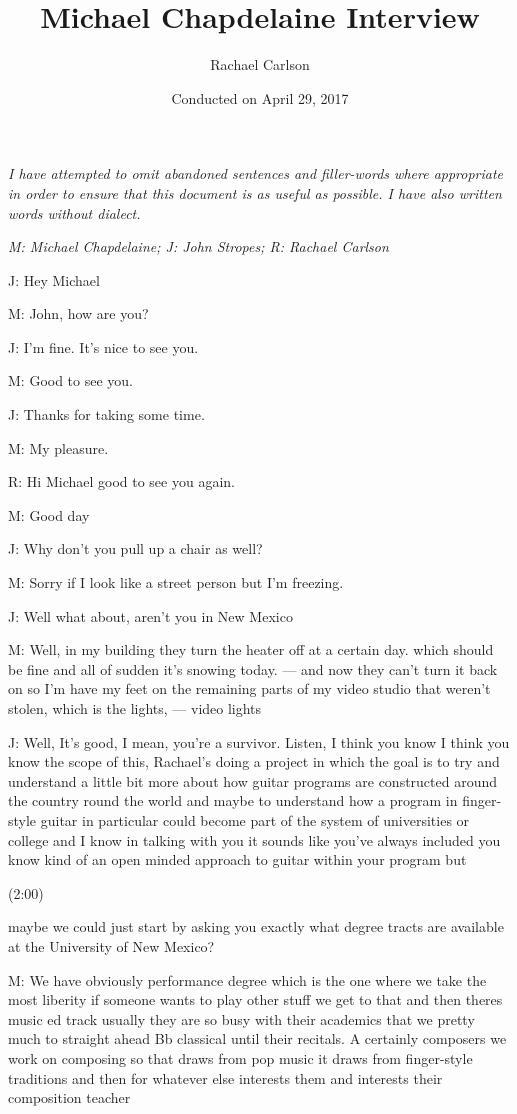 \documentclass[11pt]{article}
\author{Rachael Carlson}
\date{Conducted on April 29, 2017}
\title{Michael Chapdelaine Interview}
\begin{document}
\maketitle
\flushleft

\emph{I have attempted to omit abandoned sentences and filler-words where appropriate in order to ensure that this document is as useful as possible. I have also written words without dialect.}

\emph{M: Michael Chapdelaine; J: John Stropes; R: Rachael Carlson}

J: Hey Michael

M: John, how are you?

J: I'm fine. It's nice to see you.

M: Good to see you.

J: Thanks for taking some time.

M: My pleasure.

R: Hi Michael good to see you again.

M: Good day

J: Why don't you pull up a chair as well?

M: Sorry if I look like a street person but I'm freezing.

J: Well what about, aren't you in New Mexico

M: Well, in my building they turn the heater off at a certain day. which should be fine and all of sudden it's snowing today. --- and now they can't turn it back on so I'm have my feet on the remaining parts of my video studio that weren't stolen, which is the lights, --- video lights

J: Well, It's good, I mean, you're a survivor. Listen, I think you know I think you know the scope of this, Rachael's doing a project in which the goal is to try and understand a little bit more about how guitar programs are constructed around the country round the world and maybe to understand how a program in finger-style guitar in particular could become part of the system of universities or college and I know in talking with you it sounds like you've always included you know kind of an open minded approach to guitar within your program but 

(2:00)

maybe we could just start by asking you exactly what degree tracts are available at the University of New Mexico?

M: We have obviously performance degree which is the one where we take the most liberity if someone wants to play other stuff we get to that and then theres music ed track usually they are so busy with their academics that we pretty much to straight ahead Bb classical until their recitals. A certainly composers we work on composing so that draws from pop music it draws from finger-style traditions and then for whatever else interests them and interests their composition teacher
\end{document}
